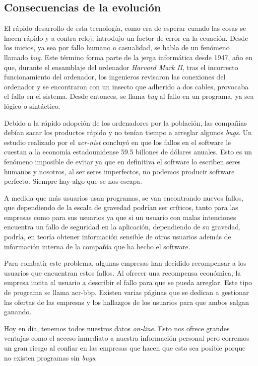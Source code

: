 \documentclass[titlepage, 12pt, a4paper]{article}
\begin{document}
\subsection{Consecuencias de la evolución}
El rápido desarrollo de esta tecnología, como era de esperar cuando las cosas se hacen rápido y a contra reloj, introdujo un factor de error en la ecuación. Desde los inicios, ya sea por fallo humano o casualidad, se habla de un fenómeno llamado \textit{\gls{bug}}. Este término forma parte de la jerga informática desde 1947, año en que, durante el ensamblaje del ordenador \textit{Harvard Mark II}, tras el incorrecto funcionamiento del ordenador, los ingenieros revisaron las conexiones del ordenador y se encontraron con un insecto que adherido a dos cables, provocaba el fallo en el sistema. Desde entonces, se llama \textit{\gls{bug}} al fallo en un programa, ya sea lógico o sintáctico.\par
Debido a la rápido adopción de los ordenadores por la población, las compañías debían sacar los productos rápido y no tenían tiempo a arreglar algunos \textit{\gls{bug}s}. Un estudio realizado por el \textit{\gls{acr-nist}} concluyó en que los fallos en el software le cuestan a la economía estadounidense 59.5 billones de dólares anuales.\cite{NIST} Esto es un fenómeno imposible de evitar ya que en definitiva el software lo escriben seres humanos y nosotros, al ser seres imperfectos, no podemos producir software perfecto. Siempre hay algo que se nos escapa.\par
A medida que más usuarios usan programas, se van encontrando nuevos fallos, que dependiendo de la escala de gravedad podrían ser críticos, tanto para las empresas como para sus usuarios ya que si un usuario con malas intenciones encuentra un fallo de seguridad en la aplicación, dependiendo de su gravedad, podría, en teoría obtener información sensible de otros usuarios además de información interna de la compañía que ha hecho el software.\par
Para combatir este problema, algunas empresas han decidido recompensar a los usuarios que encuentran estos fallos. Al ofrecer una recompensa económica, la empresa incita al usuario a describir el fallo para que se pueda arreglar. Este tipo de programa se llama \gls{acr-bbp}. Existen varias páginas que se dedican a gestionar las ofertas de las empresas y los hallazgos de los usuarios para que ambos salgan ganando.\par
Hoy en día, tenemos todos nuestros datos \textit{on-line}. Esto nos ofrece grandes ventajas como el acceso inmediato a nuestra información personal pero corremos un gran riesgo al confiar en las empresas que hacen que esto sea posible porque no existen programas sin  \textit{\gls{bug}s}.
\end{document}
